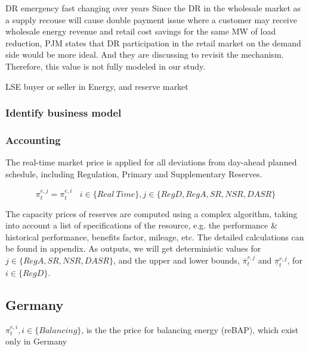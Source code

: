DR emergency fast changing over years \cite{Brown2015}
Since the DR in the wholesale market as a supply recouse will cause double payment issue where a customer may receive wholesale energy revenue and retail cost savings for the same MW of load reduction, PJM states that DR participation in the retail market on the demand side would be more ideal. And they are discussing to revisit the mechanism. Therefore, this value is not fully modeled in our study.

LSE
buyer or seller in Energy, and reserve market

\subsubsection{Identify business model}



\subsubsection{Accounting}





The real-time market price is applied for all deviations from day-ahead planned schedule, including Regulation, Primary and Supplementary Reserves.

\begin{equation*}
\pi_t^{e,j} = \pi_t^{e,i} ~~~~ i \in \{Real~Time\}, j \in \{RegD, RegA, SR, NSR, DASR\}
\end{equation*}

The capacity prices of reserves are computed using a complex algorithm, taking into account a list of specifications of the resource, e.g. the performance \& historical performance, benefits factor, mileage, etc. The detailed calculations can be found in appendix. As outputs, we will get deterministic values for $j \in \{RegA, SR, NSR, DASR\}$, and the upper and lower bounds, $\overline{\pi}_t^{r,j}$ and $\underline{\pi}_t^{r,j}$, for $i \in \{RegD\}$.


\subsection{Germany}


$\pi_t^{e,i}, i \in \{Balancing\}$, is the the price for balancing energy (reBAP), which exist only in Germany

